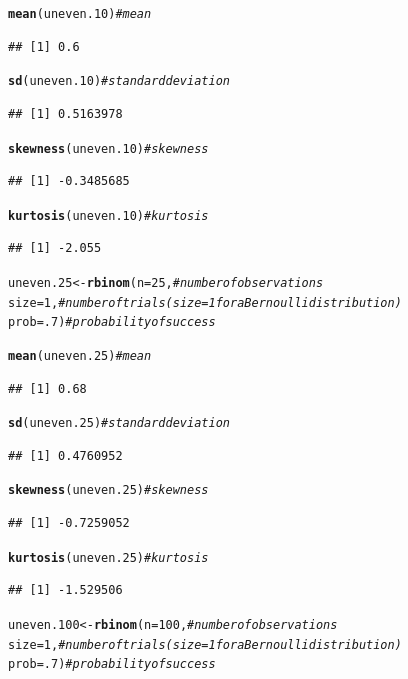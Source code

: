 \documentclass{article}\usepackage[]{graphicx}\usepackage[]{color}
\makeatletter
\newcommand{\hlnum}[1]{\textcolor[rgb]{0.686,0.059,0.569}{#1}}%
\newcommand{\hlcom}[1]{\textcolor[rgb]{0.678,0.584,0.686}{\textit{#1}}}%
\newcommand{\hlstd}[1]{\textcolor[rgb]{0.345,0.345,0.345}{#1}}%
\newcommand{\hlkwb}[1]{\textcolor[rgb]{0.69,0.353,0.396}{#1}}%
\newcommand{\hlkwc}[1]{\textcolor[rgb]{0.333,0.667,0.333}{#1}}%
\newcommand{\hlkwd}[1]{\textcolor[rgb]{0.737,0.353,0.396}{\textbf{#1}}}%
\newenvironment{kframe}{%
 \def\at@end@of@kframe{}%
 \ifinner\ifhmode%
  \def\at@end@of@kframe{\end{minipage}}%
  \begin{minipage}{\columnwidth}%
 \fi\fi%
 \def\FrameCommand##1{\hskip\@totalleftmargin \hskip-\fboxsep
 \colorbox{shadecolor}{##1}\hskip-\fboxsep
     \hskip-\linewidth \hskip-\@totalleftmargin \hskip\columnwidth}%
 \MakeFramed {\advance\hsize-\width
   \@totalleftmargin\z@ \linewidth\hsize
   \@setminipage}}%
 {\par\unskip\endMakeFramed%
 \at@end@of@kframe}
\newenvironment{knitrout}{}{} %
\makeatother
\begin{document}
\begin{enumerate}
\begin{enumerate}
\begin{knitrout}
\begin{kframe}
\begin{alltt}
\hlkwd{mean}\hlstd{(uneven.10)}                  \hlcom{#mean}
\end{alltt}
\begin{verbatim}
## [1] 0.6
\end{verbatim}
\begin{alltt}
\hlkwd{sd}\hlstd{(uneven.10)}                    \hlcom{#standard deviation}
\end{alltt}
\begin{verbatim}
## [1] 0.5163978
\end{verbatim}
\begin{alltt}
\hlkwd{skewness}\hlstd{(uneven.10)}              \hlcom{#skewness}
\end{alltt}
\begin{verbatim}
## [1] -0.3485685
\end{verbatim}
\begin{alltt}
\hlkwd{kurtosis}\hlstd{(uneven.10)}              \hlcom{#kurtosis}
\end{alltt}
\begin{verbatim}
## [1] -2.055
\end{verbatim}
\begin{alltt}
\hlstd{uneven.25}  \hlkwb{<-} \hlkwd{rbinom}\hlstd{(}\hlkwc{n}\hlstd{=}\hlnum{25}\hlstd{,}       \hlcom{#number of observations}
                   \hlkwc{size}\hlstd{=}\hlnum{1}\hlstd{,}       \hlcom{#number of trials (size=1 for a Bernoulli distribution)}
                   \hlkwc{prob}\hlstd{=}\hlnum{.7}\hlstd{)}      \hlcom{#probability of success}

\hlkwd{mean}\hlstd{(uneven.25)}                  \hlcom{#mean}
\end{alltt}
\begin{verbatim}
## [1] 0.68
\end{verbatim}
\begin{alltt}
\hlkwd{sd}\hlstd{(uneven.25)}                    \hlcom{#standard deviation}
\end{alltt}
\begin{verbatim}
## [1] 0.4760952
\end{verbatim}
\begin{alltt}
\hlkwd{skewness}\hlstd{(uneven.25)}              \hlcom{#skewness}
\end{alltt}
\begin{verbatim}
## [1] -0.7259052
\end{verbatim}
\begin{alltt}
\hlkwd{kurtosis}\hlstd{(uneven.25)}              \hlcom{#kurtosis}
\end{alltt}
\begin{verbatim}
## [1] -1.529506
\end{verbatim}
\begin{alltt}
\hlstd{uneven.100} \hlkwb{<-} \hlkwd{rbinom}\hlstd{(}\hlkwc{n}\hlstd{=}\hlnum{100}\hlstd{,}      \hlcom{#number of observations}
                   \hlkwc{size}\hlstd{=}\hlnum{1}\hlstd{,}       \hlcom{#number of trials (size=1 for a Bernoulli distribution)}
                   \hlkwc{prob}\hlstd{=}\hlnum{.7}\hlstd{)}      \hlcom{#probability of success}


\end{alltt}
\end{kframe}
\end{knitrout}
\end{enumerate}
\end{enumerate}
\end{document}
